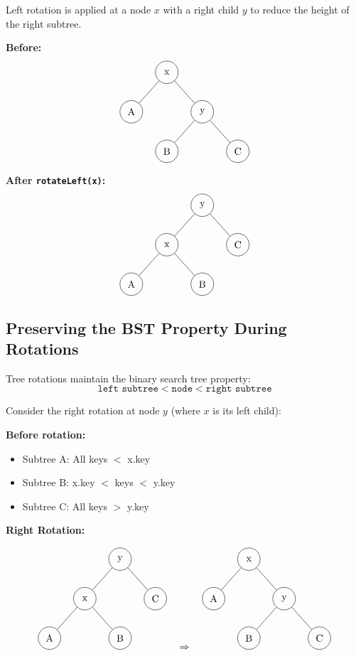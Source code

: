 \documentclass{article}
\begin{document}
Left rotation is applied at a node $x$ with a right child $y$ to reduce the height of the right subtree.

\textbf{Before:}
\[
\begin{tikzpicture}[
  every node/.style={circle, draw, minimum size=0.8cm},
  level distance=1.4cm,
  level 1/.style={sibling distance=2.5cm}
]
\node (x) {x}
  child {node {A}}
  child {node (y) {y}
    child {node {B}}
    child {node {C}}
  };
\end{tikzpicture}
\]

\textbf{After \texttt{rotateLeft(x)}:}
\[
\begin{tikzpicture}[
  every node/.style={circle, draw, minimum size=0.8cm},
  level distance=1.4cm,
  level 1/.style={sibling distance=2.5cm}
]
\node (y) {y}
  child {node (x) {x}
    child {node {A}}
    child {node {B}}
  }
  child {node {C}};
\end{tikzpicture}
\]

\subsection{Preserving the BST Property During Rotations}

Tree rotations maintain the binary search tree property:
\[
\texttt{left subtree} < \texttt{node} < \texttt{right subtree}
\]

Consider the right rotation at node $y$ (where $x$ is its left child):

\textbf{Before rotation:}
\begin{itemize}
  \item Subtree A: All keys $<$ x.key
  \item Subtree B: x.key $<$ keys $<$ y.key
  \item Subtree C: All keys $>$ y.key
\end{itemize}

\textbf{Right Rotation:}

\[
\begin{tikzpicture}[
  every node/.style={circle, draw, minimum size=0.8cm},
  level distance=1.4cm,
  level 1/.style={sibling distance=2.5cm}
]
\node (y) {y}
  child {node (x) {x}
    child {node {A}}
    child {node {B}}
  }
  child {node {C}};
\end{tikzpicture}
\quad
\Rightarrow
\quad
\begin{tikzpicture}[
  every node/.style={circle, draw, minimum size=0.8cm},
  level distance=1.4cm,
  level 1/.style={sibling distance=2.5cm}
]
\node (x) {x}
  child {node {A}}
  child {node (y) {y}
    child {node {B}}
    child {node {C}}
  };
\end{tikzpicture}
\]
\end{document}
